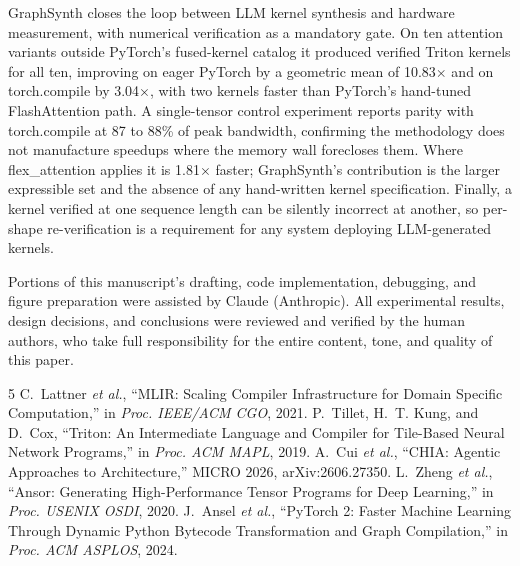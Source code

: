 \documentclass[10pt,twocolumn]{article}
\newcommand{\tc}{torch.compile}
\newcommand{\fx}{flex\_attention}
\begin{document}
GraphSynth closes the loop between LLM kernel synthesis and hardware measurement, with
numerical verification as a mandatory gate. On ten attention variants outside PyTorch's
fused-kernel catalog it produced verified Triton kernels for all ten, improving on eager
PyTorch by a geometric mean of 10.83$\times$ and on \tc{} by 3.04$\times$, with two
kernels faster than PyTorch's hand-tuned FlashAttention path. A single-tensor control
experiment reports parity with \tc{} at 87 to 88\% of peak bandwidth, confirming the
methodology does not manufacture speedups where the memory wall forecloses them. Where
\fx{} applies it is 1.81$\times$ faster; GraphSynth's contribution is the larger
expressible set and the absence of any hand-written kernel specification. Finally, a
kernel verified at one sequence length can be silently incorrect at another, so
per-shape re-verification is a requirement for any system deploying LLM-generated
kernels.

\par\vspace{8pt}
\vspace{3pt}

\noindent
Portions of this manuscript's drafting, code implementation, debugging, and figure
preparation were assisted by Claude (Anthropic). All experimental results, design
decisions, and conclusions were reviewed and verified by the human authors, who take full
responsibility for the entire content, tone, and quality of this paper.

\balance
\begin{thebibliography}{5}
\setlength{\itemsep}{0pt}\setlength{\parskip}{0pt}
 C.~Lattner \textit{et al.}, ``MLIR: Scaling Compiler Infrastructure for Domain Specific Computation,'' in \textit{Proc. IEEE/ACM CGO}, 2021.
 P.~Tillet, H.~T. Kung, and D.~Cox, ``Triton: An Intermediate Language and Compiler for Tile-Based Neural Network Programs,'' in \textit{Proc. ACM MAPL}, 2019.
 A.~Cui \textit{et al.}, ``CHIA: Agentic Approaches to Architecture,'' MICRO 2026, arXiv:2606.27350.
 L.~Zheng \textit{et al.}, ``Ansor: Generating High-Performance Tensor Programs for Deep Learning,'' in \textit{Proc. USENIX OSDI}, 2020.
 J.~Ansel \textit{et al.}, ``PyTorch 2: Faster Machine Learning Through Dynamic Python Bytecode Transformation and Graph Compilation,'' in \textit{Proc. ACM ASPLOS}, 2024.
\end{thebibliography}
\end{document}
